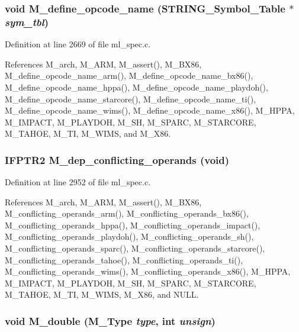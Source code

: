 \subsubsection{\setlength{\rightskip}{0pt plus 5cm}void M\_\-define\_\-opcode\_\-name (\bf{STRING\_\-Symbol\_\-Table} $\ast$ {\em sym\_\-tbl})}\label{m__spec_8h_23298a53583bc0b4f66c637ecbf1f105}




Definition at line 2669 of file ml\_\-spec.c.

References M\_\-arch, M\_\-ARM, M\_\-assert(), M\_\-BX86, M\_\-define\_\-opcode\_\-name\_\-arm(), M\_\-define\_\-opcode\_\-name\_\-bx86(), M\_\-define\_\-opcode\_\-name\_\-hppa(), M\_\-define\_\-opcode\_\-name\_\-playdoh(), M\_\-define\_\-opcode\_\-name\_\-starcore(), M\_\-define\_\-opcode\_\-name\_\-ti(), M\_\-define\_\-opcode\_\-name\_\-wims(), M\_\-define\_\-opcode\_\-name\_\-x86(), M\_\-HPPA, M\_\-IMPACT, M\_\-PLAYDOH, M\_\-SH, M\_\-SPARC, M\_\-STARCORE, M\_\-TAHOE, M\_\-TI, M\_\-WIMS, and M\_\-X86.
\subsubsection{\setlength{\rightskip}{0pt plus 5cm}\bf{IFPTR2} M\_\-dep\_\-conflicting\_\-operands (void)}\label{m__spec_8h_19c8877ed3c64496ba4d90a47b22bcbf}




Definition at line 2952 of file ml\_\-spec.c.

References M\_\-arch, M\_\-ARM, M\_\-assert(), M\_\-BX86, M\_\-conflicting\_\-operands\_\-arm(), M\_\-conflicting\_\-operands\_\-bx86(), M\_\-conflicting\_\-operands\_\-hppa(), M\_\-conflicting\_\-operands\_\-impact(), M\_\-conflicting\_\-operands\_\-playdoh(), M\_\-conflicting\_\-operands\_\-sh(), M\_\-conflicting\_\-operands\_\-sparc(), M\_\-conflicting\_\-operands\_\-starcore(), M\_\-conflicting\_\-operands\_\-tahoe(), M\_\-conflicting\_\-operands\_\-ti(), M\_\-conflicting\_\-operands\_\-wims(), M\_\-conflicting\_\-operands\_\-x86(), M\_\-HPPA, M\_\-IMPACT, M\_\-PLAYDOH, M\_\-SH, M\_\-SPARC, M\_\-STARCORE, M\_\-TAHOE, M\_\-TI, M\_\-WIMS, M\_\-X86, and NULL.
\subsubsection{\setlength{\rightskip}{0pt plus 5cm}void M\_\-double (\bf{M\_\-Type} {\em type}, int {\em unsign})}\label{m__spec_8h_129481aafa26c5b5e773484bfa68b754}




